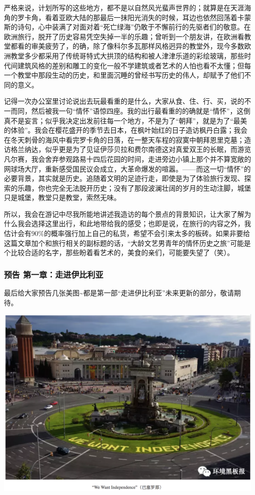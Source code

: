 \documentclass[]{book}
\begin{document}
严格来说，计划所写的这些地方，都不是以自然风光蜚声世界的；就算是在天涯海角的罗卡角，看着亚欧大陆的那最后一抹阳光消失的时候，耳边也依然回荡着卡蒙斯的诗句，心中装满了对面对着``死亡绿海''仍敢于不懈前行的先驱者们的敬意。在欧洲旅行，脱开了历史容易凭空失掉一半的乐趣；曾听到一个朋友讲，在欧洲看教堂都看的审美疲劳了，的确，除了像科尔多瓦那样风格迥异的教堂外，现今多数欧洲教堂多少都采用了传统哥特式大拱顶的结构和被人津津乐道的彩绘玻璃，那些时代间建筑风格的差别和雕工的变化一般不学建筑或者艺术的人怕也看不太懂；但每一个教堂中那段生动的历史，和里面沉睡的曾经书写历史的伟人，却赋予了他们不同的意义。

记得一次办公室里讨论说出去玩最看重的是什么，大家从食、住、行、买，说的不一而同，然后被我一句``情怀''语惊四座。我的出行最看重的的确就是``情怀''，这倒真不是妄言；似乎我决定出发前往每一个地方，不是为了``朝拜''，就是为了``最美的体验''。我会在樱花盛开的季节去日本，在枫叶始红的日子造访枫丹白露；我会在冬天刺骨的海风中看完罗卡角的日落，在一整天车程的寂寞中朝拜恩里克墓；造访格兰纳达，似乎更是为了见证伊莎贝拉和费尔南德这对真爱双王的长眠，而游览凡尔赛，我会舍弃参观路易十四后花园的时间，走进旁边小镇上那个并不算宽敞的网球场大厅，重新感受国民议会成立，大革命爆发的喧嚣。------而这一切``情怀''的必要背景，其实就是历史。追随着文明的足迹行走，即使是为了体验旅行发现、探索的乐趣，你也完全无法脱开历史；没有了那段波澜壮阔的岁月的生动注脚，城堡只是城堡，教堂只是教堂，索然无味。

所以，我会在游记中尽我所能地讲述我造访的每个景点的背景知识，让大家了解为什么我会选择这里出行，和此地带给我的感受；也即是说，在旅行的内容之外，我估计会有90\%的概率强行加上自己的私货，希望不会引来太多的板砖。如果非要给这篇文章加个和旅行相关的副标题的话，``大龄文艺男青年的情怀历史之旅''可能是个比较合适的名字，那些盼着看艺术的，美食的亲们，可能要失望了（笑）。

\subsubsection{预告 第一章：走进伊比利亚}\label{-}

最后给大家预告几张美图\textasciitilde{}都是第一部``走进伊比利亚''未来更新的部分，敬请期待。

\includegraphics[width=8.33in]{images/xt3}
\end{document}
